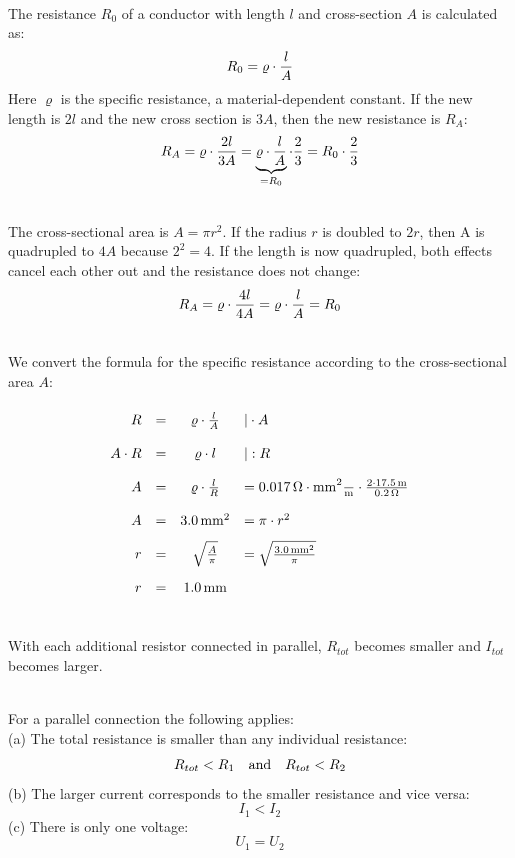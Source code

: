 \documentclass[a4paper]{article}
\begin{document}
	\\
	The resistance $R_0$ of a conductor with length $l$ and cross-section $A$ is calculated as:
	$$R_0= \varrho \cdot {l \over A}$$
	Here $\varrho$ is the specific resistance, a material-dependent constant. If the new length is $2l$ and the new cross section is $3A$, then the new resistance is $R_A:$
	$$R_A= \varrho \cdot { 2 l \over 3 A} = \underbrace{\varrho \cdot { l\over A}}_{=R_0} \cdot {2 \over 3}=R_0 \cdot {2 \over 3}$$
	\vspace{0.5 cm}
	
	\\
	The cross-sectional area is $A=\pi r^2$. If the radius $r$ is doubled to $2r$, then A is quadrupled to $4A$ because $2^2=4$. If the length is now quadrupled, both effects cancel each other out and the resistance does not change:
	$$R_A= \varrho \cdot { 4l \over 4 A} =\varrho \cdot { l\over A}=R_0$$
	\vspace{0.5 cm}
	
	\\
	We convert the formula for the specific resistance according to the cross-sectional area $A$:
	$$
	\renewcommand{\arraystretch}{2}
	\begin{array}{rccl}
		R &=& \varrho \cdot {l \over A} &| \cdot A \\
		A \cdot R &=& \varrho \cdot l &| : R \\
		A &=& \varrho \cdot {l \over R} & =\SI{0.017}{\ohm\cdot\milli\meter^2\over \meter}\cdot {2\cdot \SI{17.5} {\meter}\over \SI{0,2}{\ohm}}\\
		A &=& \SI{3,0}{\milli\meter^2} & = \pi \cdot r^2 \\
		r &=& \sqrt{A \over \pi} &= \sqrt{\SI{3,0}{\milli\meter^2}\over \pi}\\
		r &=& \SI{1,0}{\milli\meter}
	\end{array}
	$$
	\vspace{0.5 cm}
	
	\\
	With each additional resistor connected in parallel, $R_{tot}$ becomes smaller and $I_{tot}$ becomes larger.
	\vspace{0.5 cm}
	
	 \\
	For a parallel connection the following applies:\\
	(a) The total resistance is smaller than any individual resistance:
	$$R_{tot}<R_1 \quad {\rm and} \quad R_{tot}<R_2$$
	(b) The larger current corresponds to the smaller resistance and vice versa:
	$$I_1<I_2$$
	(c) There is only one voltage:
	$$U_1=U_2$$
	\vspace{0.5 cm}
	
\end{document}
